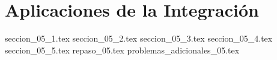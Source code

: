 \chapter{Aplicaciones de la Integración}
{seccion_05_1.tex}
{seccion_05_2.tex}
{seccion_05_3.tex}
{seccion_05_4.tex}
{seccion_05_5.tex}
{repaso_05.tex}
{problemas_adicionales_05.tex}
